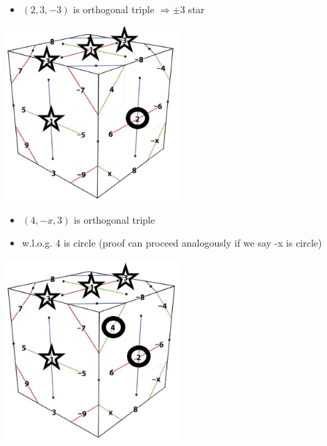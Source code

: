 \documentclass{beamer}
\begin{document}
\begin{frame}
\begin{itemize}
\item $(2,3,-3)$ is orthogonal triple $\Rightarrow\pm3$ star
\end{itemize}
\begin{center}
\includegraphics[width=0.5\textwidth]{KSProof02.jpg}
\end{center}
\end{frame}

\begin{frame}
\begin{itemize}
\item $(4,-x,3)$ is orthogonal triple 
\item w.l.o.g. 4 is circle (proof can proceed analogously if we say -x is circle)
\end{itemize}
\begin{center}
\includegraphics[width=0.5\textwidth]{KSProof03.jpg}
\end{center}
\end{frame}
\end{document}
